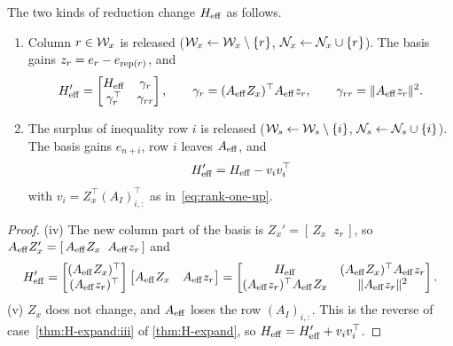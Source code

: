 \begin{theorem} \label{thm:H-reduce}
The two kinds of reduction change $H_{\mathrm{eff}}$ as follows.
\begin{enumerate}
    \item[(iv)] Column $r\in\mathcal{W}_x$ is released ($\mathcal{W}_x\gets\mathcal{W}_x\setminus\{r\}$, $\mathcal{N}_x\gets\mathcal{N}_x\cup\{r\}$).
          The basis gains $z_r = e_r - e_{\operatorname{rep}(r)}$, and
          \begin{equation} \label{eq:bordered}
          H_{\mathrm{eff}}' = \begin{bmatrix}H_{\mathrm{eff}} & \gamma_r\\ \gamma_r^\top & \gamma_{rr}\end{bmatrix},\qquad
          \gamma_r = (A_{\mathrm{eff}} Z_x)^\top A_{\mathrm{eff}} z_r,\qquad \gamma_{rr} = \lVert A_{\mathrm{eff}} z_r\rVert^2 .
          \end{equation}
    \item[(v)] The surplus of inequality row $i$ is released ($\mathcal{W}_s\gets\mathcal{W}_s\setminus\{i\}$,
          $\mathcal{N}_s\gets\mathcal{N}_s\cup\{i\}$). The basis gains $e_{n+i}$, row $i$ leaves $A_{\mathrm{eff}}$, and
          \begin{equation} \label{eq:rank-one-down}
          H_{\mathrm{eff}}' = H_{\mathrm{eff}} - v_iv_i^\top
          \end{equation}
          with $v_i = Z_x^\top(A_I)_{i,:}^\top$ as in~\eqref{eq:rank-one-up}.
\end{enumerate}
\end{theorem}

\begin{proof}
(iv) The new column part of the basis is $Z_x' = [\,Z_x\;\;z_r\,]$, so
$A_{\mathrm{eff}} Z_x' = [\,A_{\mathrm{eff}} Z_x\;\;A_{\mathrm{eff}} z_r\,]$ and
\[
H_{\mathrm{eff}}' = \begin{bmatrix}(A_{\mathrm{eff}} Z_x)^\top\\ (A_{\mathrm{eff}} z_r)^\top\end{bmatrix}\begin{bmatrix}A_{\mathrm{eff}} Z_x & A_{\mathrm{eff}} z_r\end{bmatrix}
= \begin{bmatrix}H_{\mathrm{eff}} & (A_{\mathrm{eff}} Z_x)^\top A_{\mathrm{eff}} z_r\\ (A_{\mathrm{eff}} z_r)^\top A_{\mathrm{eff}} Z_x & \lVert A_{\mathrm{eff}} z_r\rVert^2\end{bmatrix}.
\]
(v) $Z_x$ does not change, and $A_{\mathrm{eff}}$ loses the row $(A_I)_{i,:}$. This is the reverse of
case~\ref{thm:H-expand:iii} of \cref{thm:H-expand}, so $H_{\mathrm{eff}} = H_{\mathrm{eff}}' + v_iv_i^\top$.
\end{proof}

